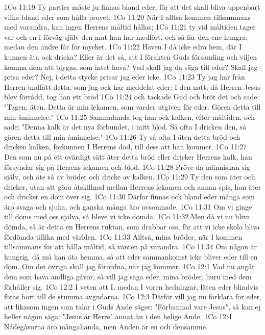 1Co 11:19  Ty partier måste ju finnas bland eder, för att det skall bliva uppenbart vilka bland eder som hålla provet.
1Co 11:20  När I alltså kommen tillsammans med varandra, kan ingen Herrens måltid hållas;
1Co 11:21  ty vid måltiden tager var och en i förväg själv den mat han har medfört, och så får den ene hungra, medan den andre får för mycket.
1Co 11:22  Haven I då icke edra hem, där I kunnen äta ock dricka? Eller är det så, att I förakten Guds församling och viljen komma dem att blygas, som intet hava? Vad skall jag då säga till eder? Skall jag prisa eder? Nej, i detta stycke prisar jag eder icke.
1Co 11:23  Ty jag har från Herren undfått detta, som jag ock har meddelat eder: I den natt, då Herren Jesus blev förrådd, tog han ett bröd
1Co 11:24  och tackade Gud och bröt det och sade: "Tagen, äten. Detta är min lekamen, som varder utgiven för eder. Gören detta till min åminnelse."
1Co 11:25  Sammalunda tog han ock kalken, efter måltiden, och sade: "Denna kalk är det nya förbundet, i mitt blod. Så ofta I dricken den, så gören detta till min åminnelse."
1Co 11:26  Ty så ofta I äten detta bröd och dricken kalken, förkunnen I Herrens död, till dess att han kommer.
1Co 11:27  Den som nu på ett ovärdigt sätt äter detta bröd eller dricker Herrens kalk, han försyndar sig på Herrens lekamen och blod.
1Co 11:28  Pröve då människan sig själv, och äte så av brödet och dricke av kalken.
1Co 11:29  Ty den som äter och dricker, utan att göra åtskillnad mellan Herrens lekamen och annan spis, han äter och dricker en dom över sig.
1Co 11:30  Därför finnas ock bland eder många som äro svaga och sjuka, och ganska många äro avsomnade.
1Co 11:31  Om vi ginge till doms med oss själva, så bleve vi icke dömda.
1Co 11:32  Men då vi nu bliva dömda, så är detta en Herrens tuktan, som drabbar oss, för att vi icke skola bliva fördömda tillika med världen.
1Co 11:33  Alltså, mina bröder, när I kommen tillsammans för att hålla måltid, så vänten på varandra.
1Co 11:34  Om någon är hungrig, då må han äta hemma, så att eder sammankomst icke bliver eder till en dom. Om det övriga skall jag förordna, när jag kommer.
1Co 12:1  Vad nu angår dem som hava andliga gåvor, så vill jag säga eder, mina bröder, huru med dem förhåller sig.
1Co 12:2  I veten att I, medan I voren hedningar, läten eder blindvis föras bort till de stumma avgudarna.
1Co 12:3  Därför vill jag nu förklara för eder, att likasom ingen som talar i Guds Ande säger: "Förbannad vare Jesus", så kan ej heller någon säga: "Jesus är Herre" annat än i den helige Ande.
1Co 12:4  Nådegåvorna äro mångahanda, men Anden är en och densamme.
